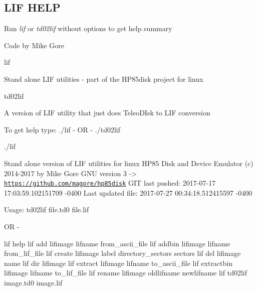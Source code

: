 \subsection*{L\+IF H\+E\+LP}

Run {\itshape lif} or {\itshape td02lif} without options to get help summary
\begin{DoxyItemize}
\item Code by Mike Gore
\begin{DoxyItemize}
\item lif
\begin{DoxyItemize}
\item Stand alone L\+IF utilities -\/ part of the H\+P85disk project for linux
\end{DoxyItemize}
\item td02lif
\begin{DoxyItemize}
\item A version of L\+IF utility that just does Teleo\+D\+Isk to L\+IF conversion
\end{DoxyItemize}
\end{DoxyItemize}

To get help type\+: ./lif -\/ OR -\/ ./td02lif
\end{DoxyItemize}


\begin{DoxyPre}
    ./lif\end{DoxyPre}



\begin{DoxyPre}    Stand alone version of LIF utilities for linux
    HP85 Disk and Device Emulator
     (c) 2014-2017 by Mike Gore
     GNU version 3
    -> \href{https://github.com/magore/hp85disk}{\tt https://github.com/magore/hp85disk}
       GIT last pushed:   2017-07-17 17:03:59.102151709 -0400
       Last updated file: 2017-07-27 00:34:18.512415597 -0400\end{DoxyPre}



\begin{DoxyPre}    Usage: td02lif file.td0 file.lif
\begin{DoxyItemize}
\item OR -
\end{DoxyItemize}\end{DoxyPre}



\begin{DoxyPre}    lif help
    lif add lifimage lifname from\_ascii\_file
    lif addbin lifimage lifname from\_lif\_file
    lif create lifimage label directory\_sectors sectors
    lif del lifimage name
    lif dir lifimage
    lif extract lifimage lifname to\_ascii\_file
    lif extractbin lifimage lifname to\_lif\_file
    lif rename lifimage oldlifname newlifname
    lif td02lif image.td0 image.lif
\end{DoxyPre}


